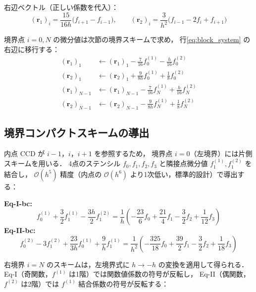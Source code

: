 \documentclass[12pt, a4paper, titlepage]{article}
\newcommand{\jp}[1]{{\normalfont\jpfont #1}}
\newcommand{\Ord}[1]{\mathcal{O}(#1)}
\newcommand{\fp}[1]{f^{(1)}_{#1}}
\newcommand{\fpp}[1]{f^{(2)}_{#1}}
\begin{document}
\jp{右辺ベクトル（正しい係数を代入）：}
\begin{equation}
  (\bm{r}_1)_i = \frac{15}{16h}\bigl(f_{i+1}-f_{i-1}\bigr),
  \qquad
  (\bm{r}_2)_i = \frac{3}{h^2}\bigl(f_{i-1}-2f_i+f_{i+1}\bigr)
  \label{eq:CCD_rhs}
\end{equation}

\jp{境界点 $i=0,N$ の微分値は次節の境界スキームで求め，
行\eqref{eq:block_system} の右辺に移行する：}
\begin{align}
  (\bm{r}_1)_1    &\leftarrow (\bm{r}_1)_1    - \tfrac{7}{16}\fp{0} - \tfrac{h}{16}\fpp{0}
  \\
  (\bm{r}_2)_1    &\leftarrow (\bm{r}_2)_1    + \tfrac{9}{8h}\fp{0} + \tfrac{1}{8}\fpp{0}
  \\
  (\bm{r}_1)_{N-1}&\leftarrow (\bm{r}_1)_{N-1} - \tfrac{7}{16}\fp{N} + \tfrac{h}{16}\fpp{N}
  \\
  (\bm{r}_2)_{N-1}&\leftarrow (\bm{r}_2)_{N-1} - \tfrac{9}{8h}\fp{N} + \tfrac{1}{8}\fpp{N}
\end{align}

\subsection{\jp{境界コンパクトスキームの導出}}

\jp{内点 CCD が $i-1$，$i$，$i+1$ を参照するため，
境界点 $i=0$（左境界）には片側スキームを用いる．
4点のステンシル $f_0, f_1, f_2, f_3$ と隣接点微分値 $\fp{1}, \fpp{1}$ を結合し，
$\Ord{h^5}$ 精度（内点の $\Ord{h^6}$ より1次低い，標準的設計）で導出する：}

\begin{tcolorbox}[mybox, title={\jp{左境界スキーム（$i=0$，$\Ord{h^5}$）}}]
\textbf{Eq-I-bc:}
\begin{equation}
  \fp{0} + \frac{3}{2}\fp{1} - \frac{3h}{2}\fpp{1}
  = \frac{1}{h}\!\left(
    -\frac{23}{6}f_0
    + \frac{21}{4}f_1
    - \frac{3}{2}f_2
    + \frac{1}{12}f_3
  \right)
  \label{eq:bc_I_left}
\end{equation}
\textbf{Eq-II-bc:}
\begin{equation}
  \fpp{0} - 3\fpp{1}
  + \frac{23}{3h}\fp{0}
  + \frac{9}{h}\fp{1}
  = \frac{1}{h^2}\!\left(
    -\frac{325}{18}f_0
    + \frac{39}{2}f_1
    - \frac{3}{2}f_2
    + \frac{1}{18}f_3
  \right)
  \label{eq:bc_II_left}
\end{equation}
\end{tcolorbox}

\jp{右境界 $i=N$ のスキームは，左境界式に $h\to-h$ の変換を適用して得られる．
Eq-I（奇関数，$\fp{}$ は1階）では関数値係数の符号が反転し，
Eq-II（偶関数，$\fpp{}$ は2階）では $\fp{}$ 結合係数の符号が反転する：}
\end{document}
